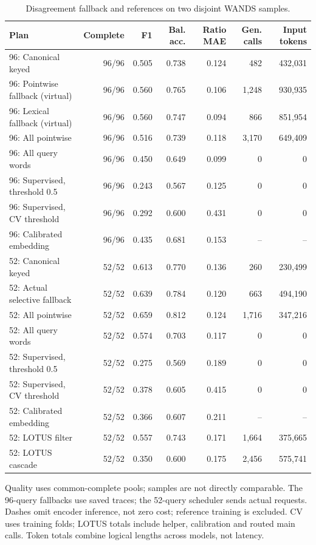 \documentclass[conference]{IEEEtran}
\begin{document}
\begin{table}[t]
\caption{Disagreement fallback and references on two disjoint WANDS samples.}
\label{tab:fallback}
\centering\small
\begin{tabular}{lrrrrrr}
\toprule
Plan & Complete & F1 & Bal. acc. & Ratio MAE & Gen. calls & Input tokens \\
\midrule
96: Canonical keyed & 96/96 & 0.505 & 0.738 & 0.124 & 482 & 432,031 \\
96: Pointwise fallback (virtual) & 96/96 & 0.560 & 0.765 & 0.106 & 1,248 & 930,935 \\
96: Lexical fallback (virtual) & 96/96 & 0.560 & 0.747 & 0.094 & 866 & 851,954 \\
96: All pointwise & 96/96 & 0.516 & 0.739 & 0.118 & 3,170 & 649,409 \\
96: All query words & 96/96 & 0.450 & 0.649 & 0.099 & 0 & 0 \\
96: Supervised, threshold 0.5 & 96/96 & 0.243 & 0.567 & 0.125 & 0 & 0 \\
96: Supervised, CV threshold & 96/96 & 0.292 & 0.600 & 0.431 & 0 & 0 \\
96: Calibrated embedding & 96/96 & 0.435 & 0.681 & 0.153 & -- & -- \\
52: Canonical keyed & 52/52 & 0.613 & 0.770 & 0.136 & 260 & 230,499 \\
52: Actual selective fallback & 52/52 & 0.639 & 0.784 & 0.120 & 663 & 494,190 \\
52: All pointwise & 52/52 & 0.659 & 0.812 & 0.124 & 1,716 & 347,216 \\
52: All query words & 52/52 & 0.574 & 0.703 & 0.117 & 0 & 0 \\
52: Supervised, threshold 0.5 & 52/52 & 0.275 & 0.569 & 0.189 & 0 & 0 \\
52: Supervised, CV threshold & 52/52 & 0.378 & 0.605 & 0.415 & 0 & 0 \\
52: Calibrated embedding & 52/52 & 0.366 & 0.607 & 0.211 & -- & -- \\
52: LOTUS filter & 52/52 & 0.557 & 0.743 & 0.171 & 1,664 & 375,665 \\
52: LOTUS cascade & 52/52 & 0.350 & 0.600 & 0.175 & 2,456 & 575,741 \\
\bottomrule
\end{tabular}
\par\smallskip
\begin{minipage}{0.94\textwidth}\footnotesize
Quality uses common-complete pools; samples are not directly comparable. The 96-query fallbacks use saved traces; the 52-query scheduler sends actual requests. Dashes omit encoder inference, not zero cost; reference training is excluded. CV uses training folds; LOTUS totals include helper, calibration and routed main calls. Token totals combine logical lengths across models, not latency.
\end{minipage}
\end{table}
\end{document}
